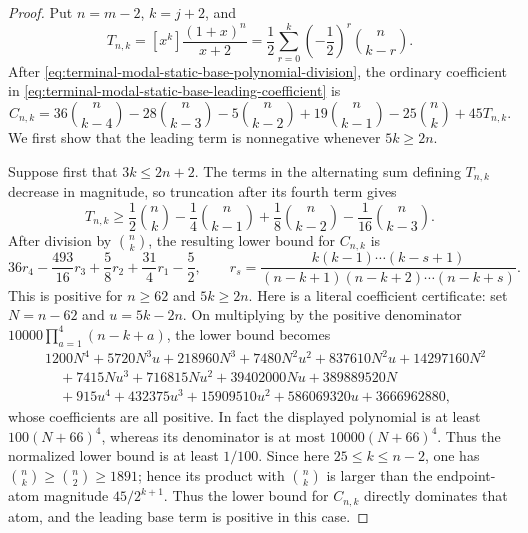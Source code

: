 \begin{proof}
Put $n=m-2$, $k=j+2$, and
\[
 T_{n,k}=[x^k]\frac{(1+x)^n}{x+2}
 =\frac12\sum_{r=0}^k\left(-\frac12\right)^r
   \binom n{k-r}.
\]
After \eqref{eq:terminal-modal-static-base-polynomial-division}, the ordinary
coefficient in \eqref{eq:terminal-modal-static-base-leading-coefficient} is
\begin{equation}
 C_{n,k}=36\binom n{k-4}-28\binom n{k-3}
 -5\binom n{k-2}+19\binom n{k-1}-25\binom nk+45T_{n,k}.
 \label{eq:terminal-modal-static-base-Cnk}
\end{equation}
We first show that the leading term is nonnegative whenever $5k\ge2n$.

Suppose first that $3k\le2n+2$.  The terms in the alternating sum defining
$T_{n,k}$ decrease in magnitude, so truncation after its fourth term gives
\[
 T_{n,k}\ge \frac12\binom nk-\frac14\binom n{k-1}
 +\frac18\binom n{k-2}-\frac1{16}\binom n{k-3}.
\]
After division by $\binom nk$, the resulting lower bound for $C_{n,k}$ is
\[
 36r_4-\frac{493}{16}r_3+\frac58r_2+\frac{31}{4}r_1-\frac52,
 \qquad
 r_s=\frac{k(k-1)\cdots(k-s+1)}
 {(n-k+1)(n-k+2)\cdots(n-k+s)}.
\]
This is positive for $n\ge62$ and $5k\ge2n$.  Here is a literal
coefficient certificate: set $N=n-62$ and $u=5k-2n$.  On multiplying by the
positive denominator $10000\prod_{a=1}^4(n-k+a)$, the lower bound becomes
\begin{align*}
 &1200N^4+5720N^3u+218960N^3+7480N^2u^2+837610N^2u
   +14297160N^2\\
 &\quad+7415Nu^3+716815Nu^2+39402000Nu+389889520N\\
 &\quad+915u^4+432375u^3+15909510u^2+586069320u
   +3666962880,
\end{align*}
whose coefficients are all positive.  In fact the displayed polynomial is
at least $100(N+66)^4$, whereas its denominator is at most
$10000(N+66)^4$.  Thus the normalized lower bound is at least $1/100$.
Since here $25\le k\le n-2$, one has
$\binom nk\ge\binom n2\ge1891$; hence its product with $\binom nk$ is
larger than the endpoint-atom magnitude $45/2^{k+1}$.  Thus the lower bound
for $C_{n,k}$ directly dominates that atom, and the leading base term is
positive in this case.


\end{proof}
